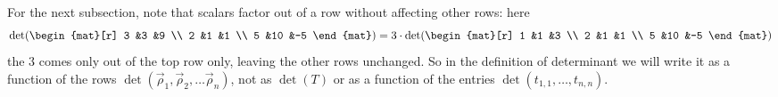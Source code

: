 For the next subsection, note that scalars factor out
of a row without affecting other rows:
here
\begin{equation*}
    \det(
      \begin{mat}[r]
        3  &3  &9  \\
        2  &1  &1  \\
        5  &10 &-5
     \end{mat}
    )
    =3 \cdot \det(
               \begin{mat}[r]
                 1  &1  &3  \\
                 2  &1  &1  \\
                 5  &10 &-5
               \end{mat}
             )                                  
\end{equation*}
the $3$ comes only out of the top row only, leaving the other rows unchanged.
So in the definition of determinant we will
write it as a function of the rows
\( \det (\vec{\rho}_1,\vec{\rho}_2,\dots\vec{\rho}_n) \), not as 
\( \det(T) \) or as a function of the entries
\( \det(t_{1,1},\dots,t_{n,n}) \).

